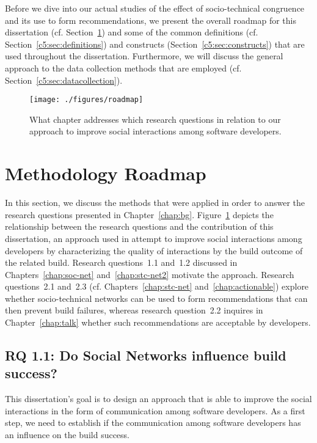 \label{chap:meth}
Before we dive into our actual studies of the effect of socio-technical congruence and its use to form recommendations, we present the overall roadmap for this dissertation (cf. Section~\ref{c5:sec:roadmap}) and some of the common definitions (cf. Section~\ref{c5:sec:definitions}) and constructs (Section~\ref{c5:sec:constructs}) that are used throughout the dissertation.
Furthermore, we will discuss the general approach to the data collection methods that are employed (cf. Section~\ref{c5:sec:datacollection}).

\begin{figure}[h!]
\centering
\texttt{[image: ./figures/roadmap]}
\caption{What chapter addresses which research questions in relation to our approach to improve social interactions among software developers.}
\label{fig:roadmap}
\end{figure}

\section{Methodology Roadmap}
\label{c5:sec:roadmap}
In this section, we discuss the methods that were applied in order to answer the research questions presented in Chapter~\ref{chap:bg}.
Figure~\ref{fig:roadmap} depicts the relationship between the research questions and the contribution of this dissertation, an approach used in attempt to improve social interactions among developers by characterizing the quality of interactions by the build outcome of the related build.
Research questions~1.1 and~1.2 discussed in Chapters~\ref{chap:soc-net} and~\ref{chap:stc-net2} motivate the approach.
Research questions~2.1 and~2.3 (cf. Chapters~\ref{chap:stc-net} and~\ref{chap:actionable}) explore whether socio-technical networks can be used to form recommendations that can then prevent build failures, whereas research question~2.2 inquires in Chapter~\ref{chap:talk} whether such recommendations are acceptable by developers.

\subsection{%
  RQ 1.1: Do Social Networks influence build success?}
This dissertation's goal is to design an approach that is able to improve the social interactions in the form of communication among software developers.
As a first step, we need to establish if the communication among software developers has an influence on the build success.


